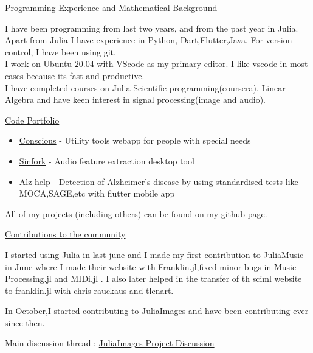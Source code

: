 \vspace{0.5cm}
\Large
\underline{\textsf{Programming Experience and Mathematical Background}}

\vspace{0.3cm}
\large
I have been programming from last two years, and from the past year in Julia.
Apart from Julia I have experience in Python, Dart,Flutter,Java. For version control, I have been using git.\\
I work on Ubuntu 20.04 with \textsf{VScode} as my primary editor. I like vscode in most cases because its fast and productive.\\
I have completed courses on Julia Scientific programming(coursera), Linear Algebra and have keen interest in signal processing(image and audio).

\vspace{0.5cm}
\Large
\underline{\textsf{Code Portfolio}}

\vspace{0.3cm}
\large
\begin{itemize}[itemsep=0.1cm,topsep=0.2cm]
    \item \href{https://devpost.com/software/conscious-kcnsqo}{Conscious} - Utility tools webapp for people with special needs
    \item \href{https://github.com/ashwani-rathee/SinFork}{Sinfork} - Audio feature extraction desktop tool
    \item \href{https://devpost.com/software/alz-help}{Alz-help} - Detection of Alzheimer's disease by using standardised tests like MOCA,SAGE,etc with flutter mobile app
\end{itemize}
All of my projects (including others) can be found on my \href{https://github.com/ashwani-rathee}{github} page.

\vspace{0.5cm}
\Large
\underline{\textsf{Contributions to the community}}

\vspace{0.3cm}
\large
I started using Julia in last june and I made my first contribution to JuliaMusic in June where I made their website with Franklin.jl,fixed minor bugs in Music Processing.jl and MIDi.jl .
I also later helped in the transfer of th sciml website to franklin.jl with chris rauckaus and tlenart.

In October,I started contributing to JuliaImages and have been contributing ever since then.

Main discussion thread : \href{https://github.com/JuliaImages/juliaimages.github.io/issues/164}{JuliaImages Project Discussion}

